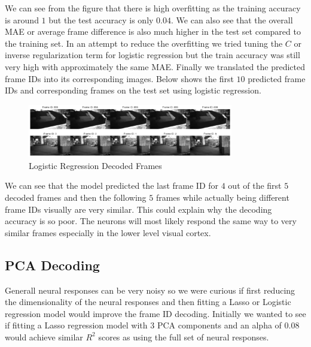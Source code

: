 \documentclass[12pt, letterpaper]{article}
\begin{document}
We can see from the figure that there is high overfitting as the training accuracy is around $1$ but the test accuracy is only $0.04$. We can also see that the overall MAE or average frame difference is also much higher in the test set compared to the training set. In an attempt to reduce the overfitting we tried tuning the $C$ or inverse regularization term for logistic regression but the train accuracy was still very high with approximately the same MAE. Finally we translated the predicted frame IDs into its corresponding images. Below shows the first $10$ predicted frame IDs and corresponding frames on the test set using logistic regression.

\begin{figure}[H]
    \centering
    \includegraphics[width=0.8\textwidth]{neuropixel_logistic_reg_video.png}
    \caption{Logistic Regression Decoded Frames}
    \label{fig:neuropixel_logistic_frame_id_decoded}
\end{figure}

We can see that the model predicted the last frame ID for $4$ out of the first $5$ decoded frames and then the following $5$ frames while actually being different frame IDs visually are very similar. This could explain why the decoding accuracy is so poor. The neurons will most likely respond the same way to very similar frames especially in the lower level visual cortex.

\subsection{PCA Decoding}
\label{subsec:pca_decoding}
Generall neural responses can be very noisy so we were curious if first reducing the dimensionality of the neural responses and then fitting a Lasso or Logistic regression model would improve the frame ID decoding. Initially we wanted to see if fitting a Lasso regression model with $3$ PCA components and an alpha of $0.08$ would achieve similar $R^2$ scores as using the full set of neural responses.
\end{document}
